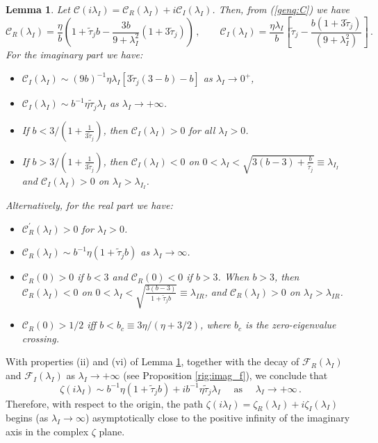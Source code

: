 \documentclass{article}%
\newtheorem{lem}[theorem]{Lemma}
\begin{document}
\begin{lem}\label{genq:prop_C} Let ${\mathcal C}(i\lambda_I)=
{\mathcal C}_R(\lambda_I) + i{\mathcal C}_{I}(\lambda_I)$. Then, from
(\ref{genq:C}) we have
\begin{equation}\label{genq:CrCI}
\mathcal{C}_{R}(\lambda_{I})  = \frac{\eta}{b}
 \left(1+\tilde{\tau}_{j} b-\frac{3b}{9+\lambda_{I}^{2}}
\left(1+3\tilde{\tau}_{j}\right)\right)\,, \qquad
\mathcal{C}_{I}(\lambda_{I})  =  \frac{\eta\lambda_{I}}{b}
  \left[ \tilde{\tau}_j - \frac{b(1+3\tilde{\tau}_j)}{(9+\lambda_{I}^{2})}
  \right]\,.
\end{equation}
For the imaginary part we have:
\begin{itemize}
\item [{(i)}] $\mathcal{C}_{I}(\lambda_{I})\sim \left(9 b\right)^{-1}
  \eta \lambda_{I}\left[3\tilde{\tau}_{j}(3-b)-b\right]$ as
  $\lambda_{I}\to 0^{+}$,
\item[{(ii)}] $\mathcal{C}_{I}(\lambda_{I})\sim b^{-1}\eta \tilde{\tau}_j
 \lambda_{I}$ as $\lambda_{I}\to+\infty$.
\item [{(iii)}] If $b<3/(1+\frac{1}{3\tilde{\tau}_{j}})$,
then $\mathcal{C}_{I}(\lambda_{I})>0$ for all $\lambda_I>0$.
\item[{(iv)}] If $b>3/(1+\frac{1}{3\tilde{\tau}_{j}})$, then
$\mathcal{C}_{I}(\lambda_{I})<0$ on $
0<\lambda_{I}<\sqrt{3(b-3)+\frac{b}{\tilde{\tau}_{j}}}\equiv\lambda_{I_{I}}$
and $\mathcal{C}_{I}(\lambda_{I})>0$ on $\lambda_I>\lambda_{I_{I}}$.
\end{itemize}
Alternatively, for the real part we have:
\begin{itemize}
\item [{(v)}] $\mathcal{C}_{R}^{\prime}(\lambda_{I})>0$ for $\lambda_{I}>0$.
\item [{(vi)}] ${\mathcal C}_{R}(\lambda_I)\sim
  b^{-1}\eta(1+\tilde{\tau}_j b)$ as $\lambda_I\to \infty$.
\item [{(vii)}] $\mathcal{C}_{R}(0)>0$ if $b<3$ and 
$\mathcal{C}_{R}(0)<0$ if $b>3$. When
$b>3$, then $\mathcal{C}_{R}(\lambda_{I})<0$ on 
$0<\lambda_{I}<\sqrt{\frac{3(b-3)}{1+\tilde{\tau}_{j}b}}\equiv \lambda_{IR}$,
and $\mathcal{C}_{R}(\lambda_{I})>0$ on $\lambda_I>\lambda_{IR}$.
\item [{(viii)}] $\mathcal{C}_{R}(0)>{1/2}$ iff $b<b_c\equiv
  {3\eta/(\eta+{3/2})}$, where $b_c$ is the zero-eigenvalue crossing.
\end{itemize}
\end{lem}

With properties (ii) and (vi) of Lemma \ref{genq:prop_C}, together
with the decay of ${\mathcal F}_R(\lambda_I)$ and ${\mathcal
  F}_I(\lambda_I)$ as $\lambda_I\to +\infty$ (see Proposition
\ref{rig:imag_f}), we conclude that
\begin{equation*}
\zeta(i\lambda_{I})\sim b^{-1}\eta \left(1+\tilde{\tau}_{j}b\right)+i
b^{-1}\eta \tilde{\tau}_{j}\lambda_{I} \quad \mbox{ as } \quad
\lambda_{I}\to+\infty\,.
\end{equation*}
Therefore, with respect to the origin, the path
$\zeta(i\lambda_I)=\zeta_R(\lambda_I)+i\zeta_I(\lambda_I)$ begins (as
$\lambda_I\to \infty$) asymptotically close to the positive infinity
of the imaginary axis in the complex $\zeta$ plane. 
\end{document}
